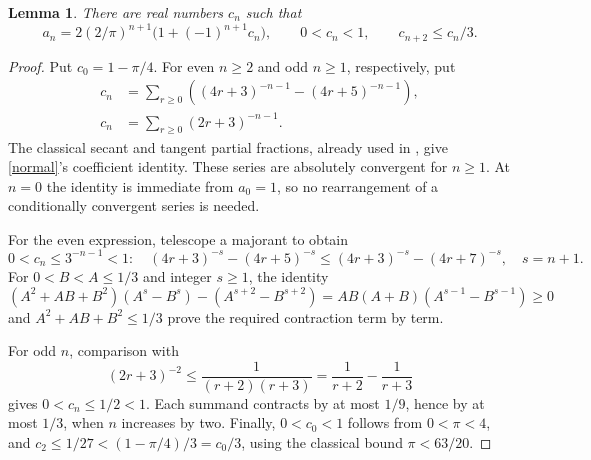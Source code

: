 \documentclass[11pt]{article}
\newtheorem{lemma}{Lemma}
\begin{document}
\begin{lemma}\label{errors}
There are real numbers $c_n$ such that
\begin{equation}\label{normal}
 a_n=2(2/\pi)^{n+1}\bigl(1+(-1)^{n+1}c_n\bigr),\qquad
 0<c_n<1,\qquad c_{n+2}\leq c_n/3.
\end{equation}
\end{lemma}
\begin{proof}
Put $c_0=1-\pi/4$. For even $n\geq2$ and odd $n\geq1$, respectively, put
\begin{align*}
 c_n&=\sum_{r\geq0}\left((4r+3)^{-n-1}-(4r+5)^{-n-1}\right),\\
 c_n&=\sum_{r\geq0}(2r+3)^{-n-1}.
\end{align*}
The classical secant and tangent partial fractions, already used in \cite[eqs.~(3.3)--(3.7)]{Sokal}, give \eqref{normal}'s coefficient identity. These series are absolutely convergent for $n\geq1$. At $n=0$ the identity is immediate from $a_0=1$, so no rearrangement of a conditionally convergent series is needed.

For the even expression, telescope a majorant to obtain
\[
 0<c_n\leq3^{-n-1}<1:
 \quad (4r+3)^{-s}-(4r+5)^{-s}
 \leq(4r+3)^{-s}-(4r+7)^{-s},\quad s=n+1.
\]
For $0<B<A\leq1/3$ and integer $s\geq1$, the identity
\[
 (A^2+AB+B^2)(A^s-B^s)-(A^{s+2}-B^{s+2})
 =AB(A+B)(A^{s-1}-B^{s-1})\geq0
\]
and $A^2+AB+B^2\leq1/3$ prove the required contraction term by term.

For odd $n$, comparison with
\[
 (2r+3)^{-2}\leq\frac1{(r+2)(r+3)}
 =\frac1{r+2}-\frac1{r+3}
\]
gives $0<c_n\leq1/2<1$. Each summand contracts by at most $1/9$, hence by at most $1/3$, when $n$ increases by two. Finally, $0<c_0<1$ follows from $0<\pi<4$, and
$c_2\leq1/27<(1-\pi/4)/3=c_0/3$, using the classical bound $\pi<63/20$.
\end{proof}
\end{document}

